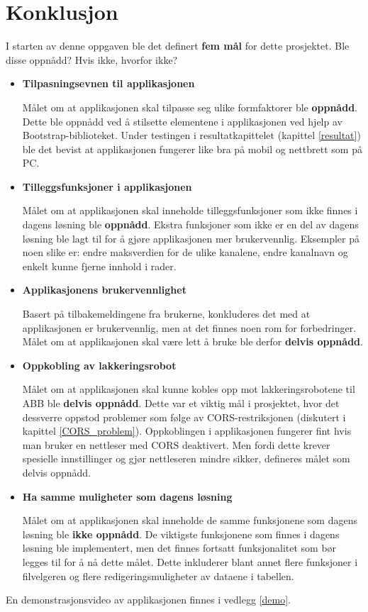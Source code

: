 \chapter{Konklusjon}
\label{konklusjon} %
I starten av denne oppgaven ble det definert \textbf{fem mål} for dette prosjektet. Ble disse oppnådd? Hvis ikke, hvorfor ikke?

\begin{itemize}
    \item \textbf{Tilpasningsevnen til applikasjonen}
    
    Målet om at applikasjonen skal tilpasse seg ulike formfaktorer ble \textbf{oppnådd}. Dette ble oppnådd ved å stilsette elementene i applikasjonen ved hjelp av Bootstrap-biblioteket. Under testingen i resultatkapittelet (kapittel \ref{resultat}) ble det bevist at applikasjonen fungerer like bra på mobil og nettbrett som på PC.
    
    \item \textbf{Tilleggsfunksjoner i applikasjonen}
    
    Målet om at applikasjonen skal inneholde tilleggsfunksjoner som ikke finnes i dagens løsning ble \textbf{oppnådd}. Ekstra funksjoner som ikke er en del av dagens løsning ble lagt til for å gjøre applikasjonen mer brukervennlig. Eksempler på noen slike er: endre maksverdien for de ulike kanalene, endre kanalnavn og enkelt kunne fjerne innhold i rader. 
    
    \item \textbf{Applikasjonens brukervennlighet}
     
    Basert på tilbakemeldingene fra brukerne, konkluderes det med at applikasjonen er brukervennlig, men at det finnes noen rom for forbedringer. Målet om at applikasjonen skal være lett å bruke ble derfor \textbf{delvis oppnådd}. 
    
    \item \textbf{Oppkobling av lakkeringsrobot}
    
    Målet om at applikasjonen skal kunne kobles opp mot lakkeringsrobotene til ABB ble \textbf{delvis oppnådd}. Dette var et viktig mål i prosjektet, hvor det dessverre oppstod problemer som følge av CORS-restriksjonen (diskutert i kapittel \ref{CORS_problem}). Oppkoblingen i applikasjonen fungerer fint hvis man bruker en nettleser med CORS deaktivert. Men fordi dette krever spesielle innstillinger og gjør nettleseren mindre sikker, defineres målet som delvis oppnådd.
    
    \item \textbf{Ha samme muligheter som dagens løsning}
    
    Målet om at applikasjonen skal inneholde de samme funksjonene som dagens løsning ble \textbf{ikke oppnådd}. De viktigste funksjonene som finnes i dagens løsning ble implementert, men det finnes fortsatt funksjonalitet som bør legges til for å nå dette målet. Dette inkluderer blant annet flere funksjoner i filvelgeren og flere redigeringsmuligheter av dataene i tabellen. 
\end{itemize}

En demonstrasjonsvideo av applikasjonen finnes i vedlegg \ref{demo}.
